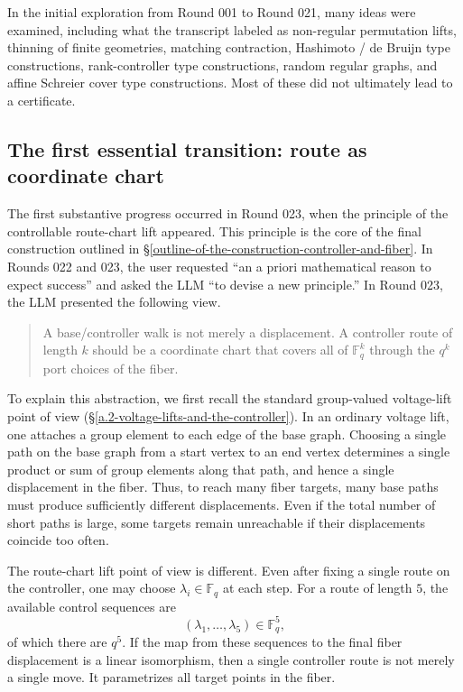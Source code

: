 \documentclass[11pt]{article}
\theoremstyle{definition}
\theoremstyle{remark}
\renewcommand{\_}{\textunderscore\allowbreak}
\begin{document}
In the initial exploration from Round 001 to Round 021, many ideas were
examined, including what the transcript labeled as non-regular
permutation lifts, thinning of finite geometries, matching contraction,
Hashimoto / de Bruijn type constructions, rank-controller type
constructions, random regular graphs, and affine Schreier cover type
constructions. Most of these did not ultimately lead to a certificate.

\subsection{The first essential transition: route as coordinate
chart}\label{the-first-essential-transition-route-as-coordinate-chart}

The first substantive progress occurred in Round 023, when the principle
of the controllable route-chart lift appeared. This principle is the
core of the final construction outlined in \S\ref{outline-of-the-construction-controller-and-fiber}. In Rounds 022 and 023,
the user requested ``an a priori mathematical reason to expect success''
and asked the LLM ``to devise a new principle.'' In Round 023, the LLM
presented the following view.

\begin{quote}
A base/controller walk is not merely a displacement. A controller route
of length \(k\) should be a coordinate chart that covers all of
\(\mathbb F_q^k\) through the \(q^k\) port choices of the fiber.
\end{quote}

To explain this abstraction, we first recall the standard group-valued
voltage-lift point of view (\S\ref{a.2-voltage-lifts-and-the-controller}). In an ordinary voltage lift, one attaches a
group element to each edge of the base graph. Choosing a single path on
the base graph from a start vertex to an end vertex determines a single
product or sum of group elements along that path, and hence a single
displacement in the fiber. Thus, to reach many fiber targets, many base
paths must produce sufficiently different displacements. Even if the
total number of short paths is large, some targets remain unreachable if
their displacements coincide too often.

The route-chart lift point of view is different. Even after fixing a
single route on the controller, one may choose
\(\lambda_i\in\mathbb F_q\) at each step. For a route of length \(5\),
the available control sequences are \[
  (\lambda_1,\ldots,\lambda_5)\in\mathbb F_q^5,
\] of which there are \(q^5\). If the map from these sequences to the
final fiber displacement is a linear isomorphism, then a single
controller route is not merely a single move. It parametrizes all target
points in the fiber.
\end{document}
